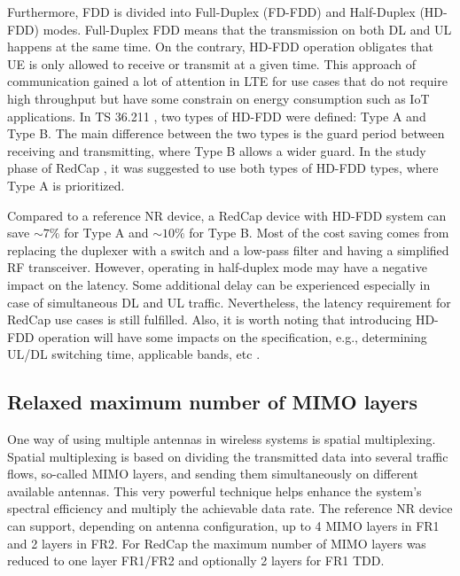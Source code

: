 \documentclass[]{IEEEtran}
\begin{document}
Furthermore, FDD is divided into Full-Duplex (FD-FDD) and Half-Duplex (HD-FDD) modes. 
Full-Duplex FDD means that the transmission on both DL and UL happens at the same time. On the contrary, HD-FDD operation obligates that UE is only allowed to receive or transmit at a given time. This approach of communication gained a lot of attention in LTE for use cases that do not require high throughput but have some constrain on energy consumption such as IoT applications. In TS 36.211 \cite{3gpp_evolved_nodate_36.211}, two types of HD-FDD were defined: Type A and Type B. The main difference between the two types is the guard period between receiving and transmitting, where Type B allows a wider guard.
In the study phase of RedCap \cite{3gpp_study_2021_38.875}, it was suggested to use both types of HD-FDD types, where Type A is prioritized.

Compared to a reference NR device, a RedCap device with HD-FDD system can save $\sim7\%$ for Type A and $\sim10\%$ for Type B. Most of the cost saving comes from replacing the duplexer with a switch and a low-pass filter and having a simplified RF transceiver.
However, operating in half-duplex mode may have a negative impact on the latency. Some additional delay can be experienced especially in case of simultaneous DL and UL traffic. Nevertheless, the latency requirement for RedCap use cases is still fulfilled. Also, it is worth noting that introducing HD-FDD operation will have some impacts on the specification, e.g., determining UL/DL switching time, applicable bands, etc \cite{ratasuk_reduced_2021}. 


\subsection{Relaxed maximum number of MIMO layers}
\label{sec:4-4}

One way of using multiple antennas in wireless systems is spatial multiplexing. Spatial multiplexing is based on dividing the transmitted data into several traffic flows, so-called MIMO layers, and sending them simultaneously on different available antennas. This very powerful technique helps enhance the system's spectral efficiency and multiply the achievable data rate.
The reference NR device can support, depending on antenna configuration, up to 4 MIMO layers in FR1 and 2 layers in FR2.
For RedCap the maximum number of MIMO layers was reduced to one layer FR1/FR2 and optionally 2 layers for FR1 TDD.
\end{document}

